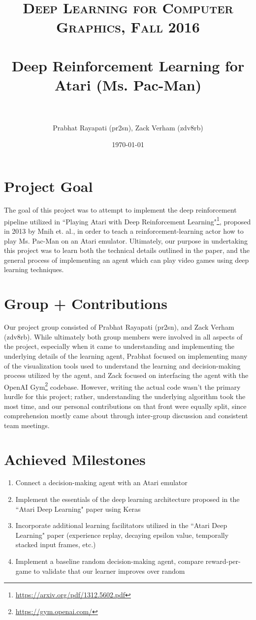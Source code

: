 \documentclass[paper=a4, fontsize=11pt]{scrartcl} %
\title{	
\normalfont \normalsize 
\textsc{Deep Learning for Computer Graphics, Fall 2016} \\ [25pt] %
\horrule{0.5pt} \\[0.4cm] %
\huge Deep Reinforcement Learning for Atari (Ms. Pac-Man) \\ %
\horrule{2pt} \\[0.5cm] %
}
\author{Prabhat Rayapati (pr2sn), Zack Verham (zdv8rb)} %
\date{\normalsize\today} %
\numberwithin{equation}{section} %
\numberwithin{figure}{section} %
\numberwithin{table}{section} %
\begin{document}
\maketitle %

\section{Project Goal}

The goal of this project was to attempt to implement the deep reinforcement pipeline utilized in ``Playing Atari with Deep Reinforcement Learning"\footnote{\url{https://arxiv.org/pdf/1312.5602.pdf}}, proposed in 2013 by Mnih et. al., in order to teach a reinforcement-learning actor how to play Ms. Pac-Man on an Atari emulator. Ultimately, our purpose in undertaking this project was to learn both the technical details outlined in the paper, and the general process of implementing an agent which can play video games using deep learning techniques. 

\section{Group + Contributions}

Our project group consisted of Prabhat Rayapati (pr2sn), and Zack Verham (zdv8rb). While ultimately both group members were involved in all aspects of the project, especially when it came to understanding and implementing the underlying details of the learning agent, Prabhat focused on implementing many of the visualization tools used to understand the learning and decision-making process utilized by the agent, and Zack focused on interfacing the agent with the OpenAI Gym\footnote{\url{https://gym.openai.com/}} codebase. However, writing the actual code wasn't the primary hurdle for this project; rather, understanding the underlying algorithm took the most time, and our personal contributions on that front were equally split, since comprehension mostly came about through inter-group discussion and consistent team meetings.

\section{Achieved Milestones}

\begin{enumerate}
\item Connect a decision-making agent with an Atari emulator
\item Implement the essentials of the deep learning architecture proposed in the ``Atari Deep Learning" paper using Keras
\item Incorporate additional learning facilitators utilized in the ``Atari Deep Learning" paper (experience replay, decaying epsilon value, temporally stacked input frames, etc.)
\item Implement a baseline random decision-making agent, compare reward-per-game to validate that our learner improves over random
\end{enumerate}
\end{document}
